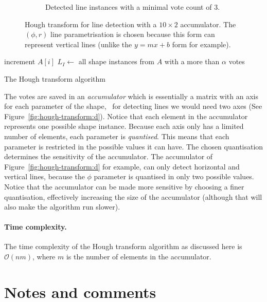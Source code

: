 \begin{figure}
\begin{subfigure}[b]{0.3\linewidth}
		\caption{Detected line instances with a minimal vote count of  3.}\label{fig:hough-transform:e}
	\end{subfigure}
	\caption{Hough transform for line detection with a $10\times2$ accumulator. The $(\phi,r)$ line parametrisation is chosen because this form can represent vertical lines (unlike the $y=mx+b$ form for example).}%
\label{fig:hough-transform}
\end{figure}
\begin{algorithm} 
	
	 {
		{
			increment $A[i]$\;
		}
	}
	$L_I \leftarrow$ all shape instances from $A$ with a more than $\alpha$ votes\;
	\caption{The Hough transform algorithm}%
\label{algo:hough-transform}
\end{algorithm}
The votes are saved in an \emph{accumulator} which is essentially a matrix with an axis for each parameter of the shape, \eg\ for detecting lines we would need two axes (See Figure~\ref{fig:hough-transform:d}).
Notice that each element in the accumulator represents one possible shape instance.
Because each axis only has a limited number of elements, each parameter is \emph{quantised}.
This means that each parameter is restricted in the possible values it can have.
The chosen quantisation determines the sensitivity of the accumulator.
The accumulator of Figure~\ref{fig:hough-transform:d} for example, can only detect horizontal and vertical lines, because the $\phi$ parameter is quantised in only two possible values.
Notice that the accumulator can be made more sensitive by choosing a finer quantisation, effectively increasing the size of the accumulator (although that will also make the algorithm run slower).

\paragraph{Time complexity.}  The time complexity of the Hough transform algorithm as discussed here is $\mathcal{O}(nm)$, where $m$ is the number of elements in the accumulator.


%
\section{Notes and comments}

